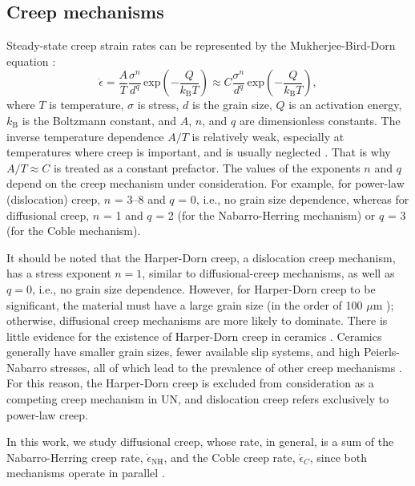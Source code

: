\documentclass[preprint,12pt,sort&compress]{elsarticle}
\newcommand{\?}{\stackrel{?}{=}}
\begin{document}
\subsection{Creep mechanisms}

Steady-state creep strain rates can be represented by the Mukherjee-Bird-Dorn equation \cite{Mukherjee2002}: 
\begin{equation}
\Dot{\epsilon} = \frac{A}{T} \frac{\sigma^n}{d^q} \, \mathrm{exp} \! \left( - \frac{Q}{k_\mathrm{B} T} \right) \approx C \frac{\sigma^n}{d^q} \, \mathrm{exp} \! \left( - \frac{Q}{k_\mathrm{B} T} \right),
\label{Eq:MBDEq}
\end{equation}
where $T$ is temperature, $\sigma$ is stress, $d$ is the grain size, $Q$ is an activation energy, $k_\mathrm{B}$ is the Boltzmann constant, and $A$, $n$, and $q$ are dimensionless constants. The inverse temperature dependence $A/T$ is relatively weak, especially at temperatures where creep is important, and is usually neglected \cite{Dowling2020}. That is why $A/T \approx C$ is treated as a constant prefactor. The values of the exponents $n$ and $q$ depend on the creep mechanism under consideration. For example, for power-law (dislocation) creep, $n$ = 3--8 and $q$ = 0, i.e., no grain size dependence, whereas for diffusional creep, $n$ = 1 and $q$ = 2 (for the Nabarro-Herring mechanism) or $q$ = 3 (for the Coble mechanism).

It should be noted that the Harper-Dorn creep, a dislocation creep mechanism, has a stress exponent $n=1$, similar to diffusional-creep mechanisms, as well as $q=0$, i.e., no grain size dependence. However, for Harper-Dorn creep to be significant, the material must have a large grain size (in the order of 100 $\mu$m \cite{Meyers2009}); otherwise, diffusional creep mechanisms are more likely to dominate. There is little evidence for the existence of Harper-Dorn creep in ceramics \cite{Meyers2009}. Ceramics generally have smaller grain sizes, fewer available slip systems, and high Peierls-Nabarro stresses, all of which lead to the prevalence of other creep mechanisms \cite{Meyers2009}. For this reason, the Harper-Dorn creep is excluded from consideration as a competing creep mechanism in UN, and dislocation creep refers exclusively to power-law creep.

In this work, we study diffusional creep, whose rate, in general, is a sum of the Nabarro-Herring creep rate, $\Dot{\epsilon}_{\mathrm{NH}}$, and the Coble creep rate, $\Dot{\epsilon}_C$, since both mechanisms operate in parallel \cite{Courtney2005}.
\end{document}
